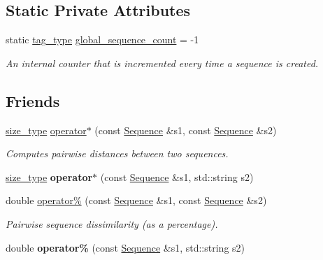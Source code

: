 \subsection*{Static Private Attributes}
\begin{DoxyCompactItemize}
\item 
static \mbox{\hyperlink{constants_8h_a3e6daf1646e952257330d8cfe20e96f8}{tag\+\_\+type}} \mbox{\hyperlink{classrcombinator_1_1Sequence_a80eb0a06612458d27aeafcb3c526f324}{global\+\_\+sequence\+\_\+count}} = -\/1
\begin{DoxyCompactList}\small\item\em An internal counter that is incremented every time a sequence is created. \end{DoxyCompactList}\end{DoxyCompactItemize}
\subsection*{Friends}
\textbf{ }\par
\begin{DoxyCompactItemize}
\item 
\mbox{\hyperlink{constants_8h_abcd18a5521fc90ff6e7b00e4fee98397}{size\+\_\+type}} \mbox{\hyperlink{classrcombinator_1_1Sequence_a8cd9dc2cfea97399387e2876ee028c32}{operator$\ast$}} (const \mbox{\hyperlink{classrcombinator_1_1Sequence}{Sequence}} \&s1, const \mbox{\hyperlink{classrcombinator_1_1Sequence}{Sequence}} \&s2)
\begin{DoxyCompactList}\small\item\em Computes pairwise distances between two sequences. \end{DoxyCompactList}\item 
\mbox{\label{classrcombinator_1_1Sequence_afdd1af7009804b182798c40d25bb1bb5}} 
\mbox{\hyperlink{constants_8h_abcd18a5521fc90ff6e7b00e4fee98397}{size\+\_\+type}} {\bfseries operator$\ast$} (const \mbox{\hyperlink{classrcombinator_1_1Sequence}{Sequence}} \&s1, std\+::string s2)
\item 
double \mbox{\hyperlink{classrcombinator_1_1Sequence_a951eb38b75bb0b9a808e3a8bc7170a09}{operator\%}} (const \mbox{\hyperlink{classrcombinator_1_1Sequence}{Sequence}} \&s1, const \mbox{\hyperlink{classrcombinator_1_1Sequence}{Sequence}} \&s2)
\begin{DoxyCompactList}\small\item\em Pairwise sequence dissimilarity (as a percentage). \end{DoxyCompactList}\item 
\mbox{\label{classrcombinator_1_1Sequence_a56fd21ad6db6a3cb7f7f4b9b5b6c84ea}} 
double {\bfseries operator\%} (const \mbox{\hyperlink{classrcombinator_1_1Sequence}{Sequence}} \&s1, std\+::string s2)
\end{DoxyCompactItemize}



